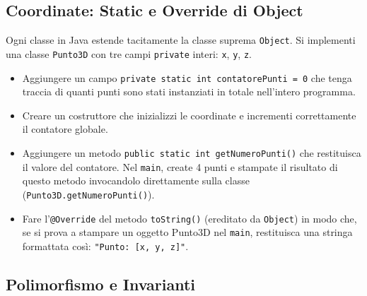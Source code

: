 \documentclass{article}
\begin{document}
\subsection{Coordinate: Static e Override di Object}
Ogni classe in Java estende tacitamente la classe suprema \texttt{Object}. 
Si implementi una classe \texttt{Punto3D} con tre campi \texttt{private} interi: \texttt{x}, \texttt{y}, \texttt{z}.
\begin{itemize}
    \item Aggiungere un campo \texttt{private static int contatorePunti = 0} che tenga traccia di quanti punti sono stati instanziati in totale nell'intero programma.
    \item Creare un costruttore che inizializzi le coordinate e incrementi correttamente il contatore globale.
    \item Aggiungere un metodo \texttt{public static int getNumeroPunti()} che restituisca il valore del contatore. Nel \texttt{main}, create 4 punti e stampate il risultato di questo metodo invocandolo direttamente sulla classe \newline(\texttt{Punto3D.getNumeroPunti()}).
    \item Fare l'\texttt{@Override} del metodo \texttt{toString()} (ereditato da \texttt{Object}) in modo che, se si prova a stampare un oggetto Punto3D nel \texttt{main}, restituisca una stringa formattata così: \texttt{"Punto: [x, y, z]"}.
\end{itemize}

\subsection{Polimorfismo e Invarianti}
\end{document}
